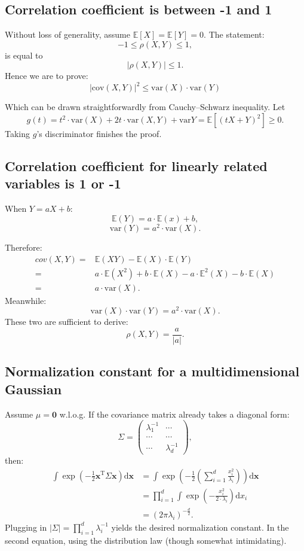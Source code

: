 \documentclass[UTF8]{ctexart}
\begin{document}
\subsection{Correlation coefficient is between -1 and 1}
Without loss of generality, assume $\mathbb{E}[X]=\mathbb{E}[Y]=0$.
The statement:
$$-1 \leq \rho(X,Y) \leq 1,$$
is equal to
$$|\rho(X,Y)| \leq 1.$$
Hence we are to prove:
$$|\text{cov}(X,Y)|^{2} \leq \text{var}(X)\cdot \text{var}(Y)$$

Which can be drawn straightforwardly from Cauchy–Schwarz inequality.
Let
$$g(t)=t^{2}\cdot\text{var}(X)+2t\cdot\text{var}(X,Y)+\text{var}{Y}=\mathbb{E}[(tX+Y)^{2}]\geq 0.$$
Taking $g$'s discriminator finishes the proof.

\subsection{Correlation coefficient for linearly related variables is 1 or -1}
When $Y=aX+b$:
$$\mathbb{E}(Y)=a\cdot\mathbb{E}(x)+b,$$
$$\text{var}(Y)=a^{2}\cdot \text{var}(X).$$

Therefore:
\begin{align}
cov(X,Y)=&\mathbb{E}(XY)-\mathbb{E}(X)\cdot\mathbb{E}(Y)\nonumber \\
=&a\cdot\mathbb{E}(X^{2})+b\cdot\mathbb{E}(X)-a\cdot\mathbb{E}^{2}(X)-b\cdot\mathbb{E}(X)\nonumber \\
=&a\cdot \text{var}(X) \nonumber.
\end{align}
Meanwhile:
$$\text{var}(X)\cdot \text{var}(Y) = a^{2}\cdot \text{var}(X).$$
These two are sufficient to derive:
$$\rho(X,Y) = \frac{a}{|a|}.$$

\subsection{Normalization constant for a multidimensional Gaussian}
Assume $\mu=\textbf{0}$ w.l.o.g.
If the covariance matrix already takes a diagonal form:
$$\Sigma=\begin{pmatrix}
\lambda_{1}^{-1} & \cdots\\
\cdots & \cdots \\
\cdots& \lambda_{d}^{-1}
\end{pmatrix},$$
then:
$$
\begin{aligned}
\int\exp\left(-\frac{1}{2}\textbf{x}^{\text{T}}\Sigma\textbf{x}\right)\text{d}\textbf{x}&=\int\exp\left(-\frac{1}{2}\left(\sum_{i=1}^{d}\frac{x_{i}^{2}}{\lambda_{i}} \right) \right)\text{d}\textbf{x} \\
&=\prod_{i=1}^{d}\int\exp\left(-\frac{x_{i}^{2}}{2\cdot\lambda_{i}} \right)\text{d}x_{i}\\
&=(2\pi\lambda_{i})^{-\frac{d}{2}}.
\end{aligned}
$$
Plugging in $|\Sigma|=\prod_{i=1}^{d}\lambda_{i}^{-1}$ yields the desired normalization constant.
In the second equation, using the distribution law (though somewhat intimidating).
\end{document}
